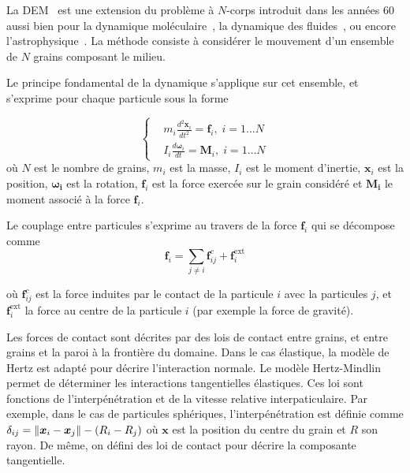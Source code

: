 La DEM~\cite{cundall_discrete_1979} est une extension du problème à $N$-corps introduit dans les années 60 aussi bien pour la dynamique moléculaire~\cite{Alder1959}, la dynamique des fluides~\cite{Allen1987}, ou encore l'astrophysique~\cite{vonHoerner1960}.
La méthode consiste à considérer le mouvement d'un ensemble de $N$ grains composant le milieu.

Le principe fondamental de la dynamique s'applique sur cet ensemble, et s'exprime pour chaque particule sous la forme

\begin{equation*}
    \left\{
    \begin{aligned}
         & m_{i} \frac{ d^{2}\bm{x}_i }{dt^2}=\bm{f}_{i},\; i=1\ldots N \\
         & I_{i} \frac{d \bm{\omega}_{i}}{dt}=\bm{M}_{i},\; i=1\ldots N
    \end{aligned}
    \right.
\end{equation*}où $N$ est le nombre de grains, $m_{i}$ est la masse, $I_i$ est le moment d'inertie, $\bm{x}_{i}$ est la position, $\bm{\omega_{i}}$ est la rotation, $\bm{f}_{i}$ est la force exercée sur le grain considéré et $\bm{M_{i}}$ le moment associé à la force $\bm{f}_{i}$.

Le couplage entre particules s'exprime au travers de la force $\bm{f}_{i}$ qui se décompose comme
\begin{equation*}
    \bm{f}_{i}=\underset{{\scriptstyle j\neq i}}{\sum}\bm{f}^{c}_{ij}+\bm{f}_i^{\text{ext}}
\end{equation*}

où $\bm{f}^{c}_{ij}$ est la force induites par le contact de la particule $i$ avec la particules $j$, et $\bm{f}_ i^{\text{ext}}$ la force au centre de la particule $i$ (par exemple la force de gravité).

Les forces de contact sont décrites par des lois de contact entre grains, et entre grains et la paroi à la frontière du domaine. Dans le cas élastique, la modèle de Hertz est adapté pour décrire l’interaction normale. Le modèle Hertz-Mindlin permet de déterminer les interactions tangentielles élastiques. Ces loi sont fonctions de l'interpénétration et de la vitesse relative interpaticulaire. Par exemple, dans le cas de particules sphériques, l'interpénétration est définie comme $\delta_{ij} = \left\lVert \bm x_i - \bm x_j \right\rVert - (R_i - R_j)$ où $\bm x$  est la position du centre du grain et $R$ son rayon. De même, on défini des loi de contact pour décrire la composante tangentielle.

